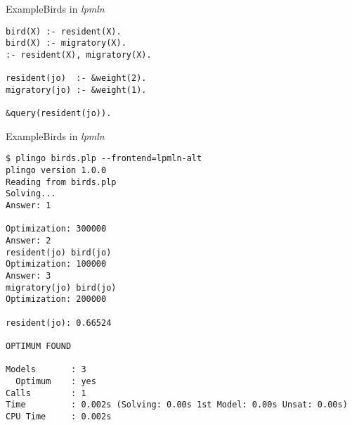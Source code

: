 \begin{frame}[fragile]{Example}{Birds in \textit{lpmln}}
\begin{lstlisting}[escapeinside=||]
bird(X) :- resident(X).
bird(X) :- migratory(X).
:- resident(X), migratory(X).

resident(jo)  :- &weight(2).
migratory(jo) :- &weight(1).

&query(resident(jo)).
\end{lstlisting}
\end{frame}
\begin{frame}[fragile]{Example}{Birds in \textit{lpmln}}
\begin{adjustbox}{max totalsize={\textwidth}{.75\textheight},keepaspectratio}
\begin{lstlisting}[escapeinside=||]
$ plingo birds.plp --frontend=lpmln-alt
plingo version 1.0.0
Reading from birds.plp
Solving...
Answer: 1

Optimization: 300000
Answer: 2
resident(jo) bird(jo)
Optimization: 100000
Answer: 3
migratory(jo) bird(jo)
Optimization: 200000

resident(jo): 0.66524

OPTIMUM FOUND

Models       : 3
  Optimum    : yes
Calls        : 1
Time         : 0.002s (Solving: 0.00s 1st Model: 0.00s Unsat: 0.00s)
CPU Time     : 0.002s
\end{lstlisting}
\end{adjustbox}
\end{frame}
%
